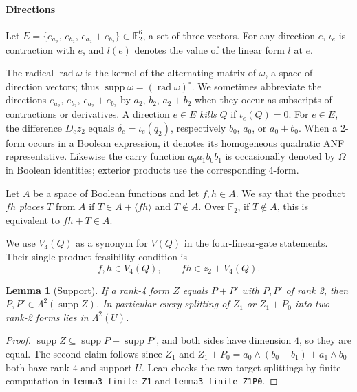 \documentclass[11pt,a4paper]{article}
\theoremstyle{plain}
\newtheorem{lemma}[theorem]{Lemma}
\theoremstyle{remark}
\theoremstyle{plain}
\newcommand{\F}{\mathbb F_2}
\newcommand{\supp}{\operatorname{supp}}
\newcommand{\rad}{\operatorname{rad}}
\newcommand{\Lam}{\Lambda^2}
\newcommand{\Dir}{E}
\begin{document}
\paragraph{Directions} Let $\Dir=\{e_{a_2},\,e_{b_2},\,e_{a_2}+e_{b_2}\}\subset\F^6$, a set of three vectors. For any direction $e$, $\iota_e$ is contraction with $e$, and $l(e)$ denotes the value of the linear form $l$ at $e$.

The radical $\rad\omega$ is the kernel of the alternating matrix of $\omega$, a space of direction vectors; thus $\supp\omega=(\rad\omega)^\circ$. We sometimes abbreviate the directions $e_{a_2}$, $e_{b_2}$, $e_{a_2}+e_{b_2}$ by $a_2$, $b_2$, $a_2+b_2$ when they occur as subscripts of contractions or derivatives. A direction $e\in E$ \emph{kills} $Q$ if $\iota_e(Q)=0$.
For $e\in E$, the difference $D_ez_2$ equals $\delta_e=\iota_e(q_2)$, respectively $b_0$, $a_0$, or $a_0+b_0$.
When a 2-form occurs in a Boolean expression, it denotes its homogeneous quadratic ANF representative. Likewise the carry function $a_0a_1b_0b_1$ is occasionally denoted by $\Omega$ in Boolean identities; exterior products use the corresponding 4-form.

Let $A$ be a space of Boolean functions and let $f,h\in A$.
We say that the product $fh$ \emph{places} $T$ from $A$ if
$T\in A+\langle fh\rangle$ and $T\notin A$.
Over $\F$, if $T\notin A$, this is equivalent to $fh+T\in A$.

We use $V_4(Q)$ as a synonym for $V(Q)$ in the four-linear-gate statements. Their single-product feasibility condition is
\begin{equation}\label{l4:eq:star}
 f,h\in V_4(Q),\qquad fh\in z_2+V_4(Q).
\end{equation}

\begin{lemma}[Support]\label{l4:lem:support}
If a rank-4 form $Z$ equals $P+P'$ with $P,P'$ of rank 2, then $P,P'\in\Lam(\supp Z)$. In particular every splitting of $Z_1$ or $Z_1+P_0$ into two rank-2 forms lies in $\Lam(U)$.
\end{lemma}

\begin{proof}
$\supp Z\subseteq\supp P+\supp P'$, and both sides have dimension $4$, so they are equal. The second claim follows since $Z_1$ and $Z_1+P_0=a_0\wedge(b_0+b_1)+a_1\wedge b_0$ both have rank $4$ and support $U$. Lean checks the two target splittings by finite computation in \nolinkurl{lemma3_finite_Z1} and \nolinkurl{lemma3_finite_Z1P0}.
\end{proof}
\end{document}
